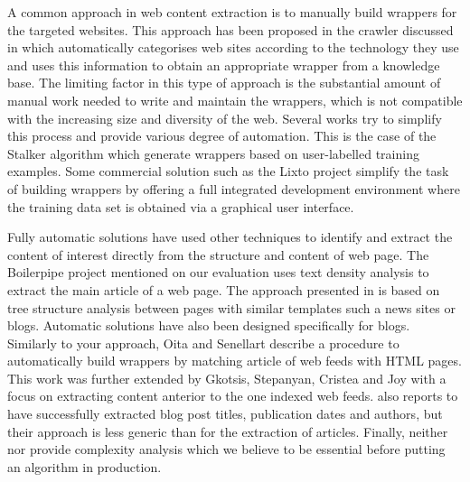 A common approach in web content extraction is to manually build wrappers for the targeted websites. This approach has been proposed in the crawler discussed in \cite{faheem2012intelligent} which automatically categorises web sites according to the technology they use and uses this information to obtain an appropriate wrapper from a knowledge base. The limiting factor in this type of approach is the substantial amount of manual work needed to write and maintain the wrappers, which is not compatible with the increasing size and diversity of the web. Several works try to simplify this process and provide various degree of automation. This is the case of the Stalker algorithm \cite{stalker} which generate wrappers based on user-labelled training examples. Some commercial solution such as the Lixto project \cite{lixto} simplify the task of building wrappers by offering a full integrated development environment where the training data set is obtained via a graphical user interface.

Fully automatic solutions have used other techniques to identify and extract the content of interest directly from the structure and content of web page. The Boilerpipe project \cite{kohlschuetter2010} mentioned on our evaluation uses text density analysis to extract the main article of a web page. The approach presented in \cite{treeedit} is based on tree structure analysis between pages with similar templates such a news sites or blogs. Automatic solutions have also been designed specifically for blogs. Similarly to your approach, Oita and Senellart \cite{oita2010} describe a procedure to automatically build wrappers by matching article of web feeds with HTML pages. This work was further extended by Gkotsis, Stepanyan, Cristea and Joy \cite{gkotsis2013} with a focus on extracting content anterior to the one indexed web feeds. \cite{gkotsis2013} also reports to have successfully extracted blog post titles, publication dates and authors, but their approach is less generic than for the extraction of articles. Finally, neither \cite{oita2010} nor \cite{gkotsis2013} provide complexity analysis which we believe to be essential before putting an algorithm in production.

